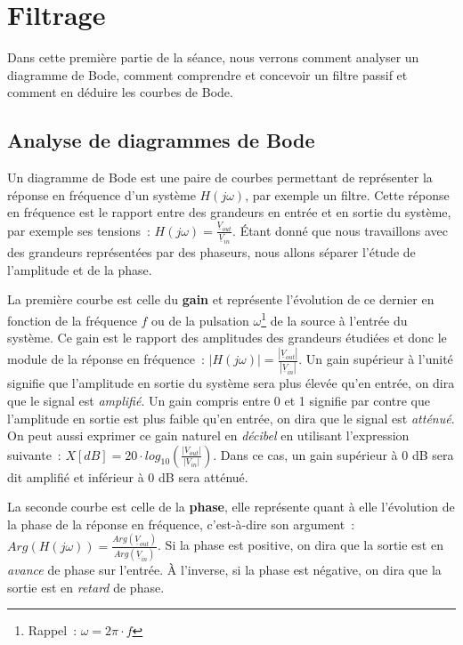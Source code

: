
\vspace{5cm}
\newpage

\section{Filtrage}
Dans cette première partie de la séance, nous verrons comment analyser un diagramme de Bode, comment comprendre et concevoir un filtre passif et comment en déduire les courbes de Bode.


\subsection{Analyse de diagrammes de Bode}
Un diagramme de Bode est une paire de courbes permettant de représenter la réponse en fréquence d'un système $H(j\omega)$, par exemple un filtre.
Cette réponse en fréquence est le rapport entre des grandeurs en entrée et en sortie du système, par exemple ses tensions~: $H(j\omega) = \frac{\underline{V}_{out}}{\underline{V}_{in}}$.
Étant donné que nous travaillons avec des grandeurs représentées par des phaseurs, nous allons séparer l'étude de l'amplitude et de la phase.

La première courbe est celle du \textbf{gain} et représente l'évolution de ce dernier en fonction de la fréquence $f$ ou de la pulsation $\omega$\footnote{Rappel~: $\omega = 2\pi \cdot f$} de la source à l'entrée du système.
Ce gain est le rapport des amplitudes des grandeurs étudiées et donc le module de la réponse en fréquence~: $|H(j\omega)| = \frac{|\underline{V}_{out}|}{|\underline{V}_{in}|}$.
Un gain supérieur à l'unité signifie que l'amplitude en sortie du système sera plus élevée qu'en entrée, on dira que le signal est \textit{amplifié}.
Un gain compris entre 0 et 1 signifie par contre que l'amplitude en sortie est plus faible qu'en entrée, on dira que le signal est \textit{atténué}.\\
On peut aussi exprimer ce gain naturel en \textit{décibel} en utilisant l'expression suivante~: $X [dB] = 20 \cdot log_{10}\left(\frac{|V_{out}|}{|V_{in}|}\right)$.
Dans ce cas, un gain supérieur à 0 dB sera dit amplifié et inférieur à 0 dB sera atténué.

La seconde courbe est celle de la \textbf{phase}, elle représente quant à elle l'évolution de la phase de la réponse en fréquence, c'est-à-dire son argument~: $Arg(H(j\omega)) = \frac{Arg(\underline{V}_{out})}{Arg(\underline{V}_{in})}$.
Si la phase est positive, on dira que la sortie est en \textit{avance} de phase sur l'entrée.
À l'inverse, si la phase est négative, on dira que la sortie est en \textit{retard} de phase.

